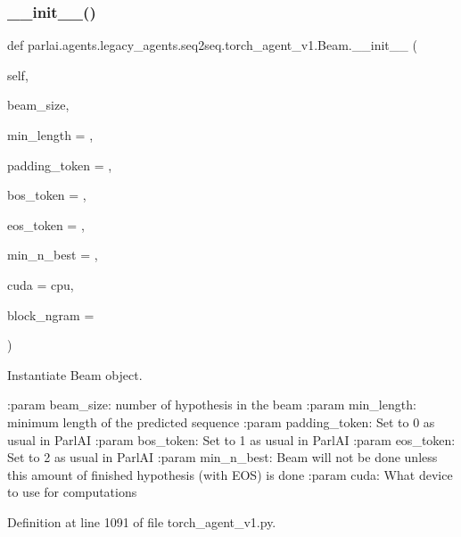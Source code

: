 \subsubsection{\texorpdfstring{\+\_\+\+\_\+init\+\_\+\+\_\+()}{\_\_init\_\_()}}
{\footnotesize\ttfamily def parlai.\+agents.\+legacy\+\_\+agents.\+seq2seq.\+torch\+\_\+agent\+\_\+v1.\+Beam.\+\_\+\+\_\+init\+\_\+\+\_\+ (\begin{DoxyParamCaption}\item[{}]{self,  }\item[{}]{beam\+\_\+size,  }\item[{}]{min\+\_\+length = {},  }\item[{}]{padding\+\_\+token = {},  }\item[{}]{bos\+\_\+token = {},  }\item[{}]{eos\+\_\+token = {},  }\item[{}]{min\+\_\+n\+\_\+best = {},  }\item[{}]{cuda = {\ttfamily \textquotesingle{}cpu\textquotesingle{}},  }\item[{}]{block\+\_\+ngram = {} }\end{DoxyParamCaption})}

\begin{DoxyVerb}Instantiate Beam object.

:param beam_size: number of hypothesis in the beam
:param min_length: minimum length of the predicted sequence
:param padding_token: Set to 0 as usual in ParlAI
:param bos_token: Set to 1 as usual in ParlAI
:param eos_token: Set to 2 as usual in ParlAI
:param min_n_best: Beam will not be done unless this amount of finished
           hypothesis (with EOS) is done
:param cuda: What device to use for computations
\end{DoxyVerb}
 

Definition at line 1091 of file torch\+\_\+agent\+\_\+v1.\+py.


